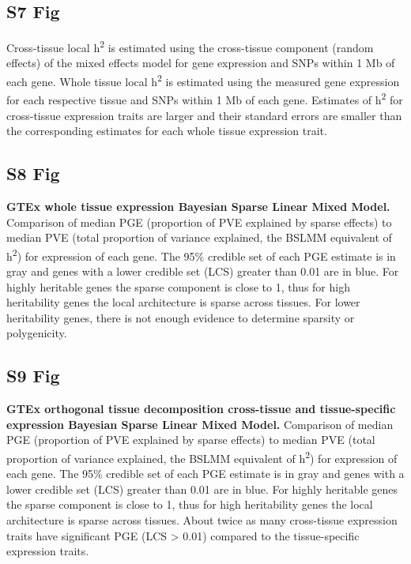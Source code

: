 \documentclass[10pt,letterpaper]{article}
\begin{document}
\begin{singlespace}
\subsection*{S7 Fig}
\label{S7_Fig}

 Cross-tissue local h\textsuperscript{2} is estimated using the cross-tissue component (random effects) of the mixed effects model for gene expression and SNPs within 1 Mb of each gene. Whole tissue local h\textsuperscript{2} is estimated using the measured gene expression for each respective tissue and SNPs within 1 Mb of each gene. Estimates of h\textsuperscript{2} for cross-tissue expression traits are larger and their standard errors are smaller than the corresponding estimates for each whole tissue expression trait.

\subsection*{S8 Fig}
\label{S8_Fig}
{\bf GTEx whole tissue expression Bayesian Sparse Linear Mixed Model.} Comparison of median PGE (proportion of PVE explained by sparse effects) to median PVE (total proportion of variance explained, the BSLMM equivalent of h\textsuperscript{2}) for expression of each gene. The 95\% credible set of each PGE estimate is in gray and genes with a lower credible set (LCS) greater than 0.01 are in blue. For highly heritable genes the sparse component is close to 1, thus for high heritability genes the local architecture is sparse across tissues. For lower heritability genes, there is not enough evidence to determine sparsity or polygenicity. 

\subsection*{S9 Fig}
\label{S9_Fig}
{\bf GTEx orthogonal tissue decomposition cross-tissue and tissue-specific expression Bayesian Sparse Linear Mixed Model.} Comparison of median PGE (proportion of PVE explained by sparse effects) to median PVE (total proportion of variance explained, the BSLMM equivalent of h\textsuperscript{2}) for expression of each gene. The 95\% credible set of each PGE estimate is in gray and genes with a lower credible set (LCS) greater than 0.01 are in blue. For highly heritable genes the sparse component is close to 1, thus for high heritability genes the local architecture is sparse across tissues. About twice as many cross-tissue expression traits have significant PGE (LCS \textgreater{} 0.01) compared to the tissue-specific expression traits.


\end{singlespace}
\end{document}
